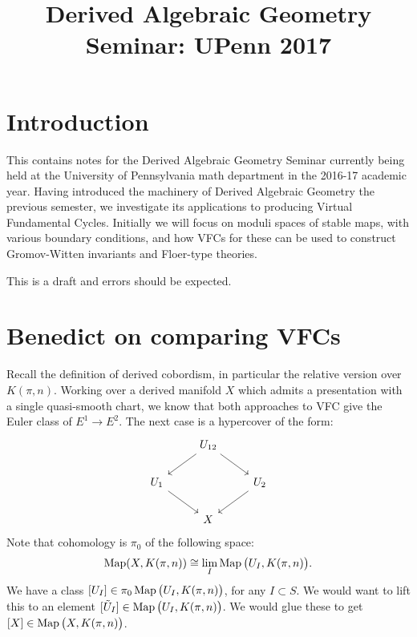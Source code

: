 \documentclass[10pt,a4paper,reqno,oneside]{book} %
\title{Derived Algebraic Geometry Seminar: UPenn 2017}
\theoremstyle{plain}
\theoremstyle{definition}
\theoremstyle{remark}
\numberwithin{equation}{section}
\begin{document}
\maketitle
\tableofcontents

\chapter*{Introduction}
 

This contains notes for the Derived Algebraic Geometry Seminar currently being held at the University of Pennsylvania 
math department in the 2016-17 academic year. Having introduced the machinery of Derived Algebraic Geometry the previous semester,
we investigate its applications to producing Virtual Fundamental Cycles. Initially we will focus on moduli spaces of stable
maps, with various boundary conditions, and how VFCs for these can be used to construct Gromov-Witten invariants and Floer-type
theories.

This is a draft and errors should be expected.

















\chapter{Benedict on comparing VFCs}
Recall the definition of derived cobordism, in particular the relative version over $K(\pi, n)$. Working over a derived manifold
$X$ which admits a presentation with a single quasi-smooth chart, we know that both approaches to VFC give the Euler class of
$E^1 \to E^2$. The next case is a hypercover of the form:
\[
\begin{tikzcd}
\; & U_{12}\arrow{dr}\arrow{dl} & \\
U_1\arrow{dr} & & U_2\arrow{dl} \\
 & X & 
\end{tikzcd}
\]
Note that cohomology is $\pi_0$ of the following space:
\[	\operatorname{Map} (X,K(\pi,n)) \cong \lim_I \operatorname{Map}\big(U_I, K(\pi,n)\big) . \]
We have a class $[U_I] \in \pi_0 \operatorname{Map}\big(U_I,K(\pi,n)\big)$, for any $I \subset S$. We would want to lift this to
an element $[\tilde U_I] \in \operatorname{Map}\big(U_I,K(\pi,n)\big)$. We would glue these to get $[X] \in \operatorname{Map}\big(X,K(\pi,n)\big)$.
\end{document}
